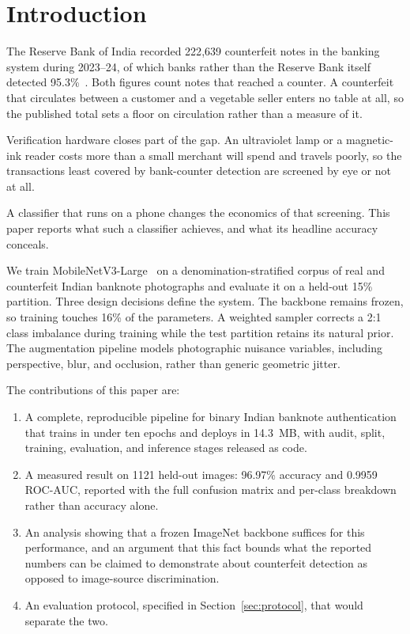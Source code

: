 \documentclass[conference]{IEEEtran}
\begin{document}
\section{Introduction}

The Reserve Bank of India recorded 222{,}639 counterfeit notes in the banking
system during 2023--24, of which banks rather than the Reserve Bank itself
detected 95.3\%~\cite{rbi2024annual}. Both figures count notes that reached a
counter. A counterfeit that circulates between a customer and a vegetable seller
enters no table at all, so the published total sets a floor on circulation rather
than a measure of it.

Verification hardware closes part of the gap. An ultraviolet lamp or a
magnetic-ink reader costs more than a small merchant will spend and travels
poorly, so the transactions least covered by bank-counter detection are screened
by eye or not at all.

A classifier that runs on a phone changes the economics of that screening. This
paper reports what such a classifier achieves, and what its headline accuracy
conceals.

We train MobileNetV3-Large~\cite{howard2019mobilenetv3} on a
denomination-stratified corpus of real and counterfeit Indian banknote
photographs and evaluate it on a held-out 15\% partition. Three design decisions
define the system. The backbone remains frozen, so training touches 16\% of the
parameters. A weighted sampler corrects a 2:1 class imbalance during training
while the test partition retains its natural prior. The augmentation pipeline
models photographic nuisance variables, including perspective, blur, and
occlusion, rather than generic geometric jitter.

The contributions of this paper are:

\begin{enumerate}
\item A complete, reproducible pipeline for binary Indian banknote
authentication that trains in under ten epochs and deploys in 14.3~MB, with
audit, split, training, evaluation, and inference stages released as code.
\item A measured result on 1121 held-out images: 96.97\% accuracy and 0.9959
ROC-AUC, reported with the full confusion matrix and per-class breakdown rather
than accuracy alone.
\item An analysis showing that a frozen ImageNet backbone suffices for this
performance, and an argument that this fact bounds what the reported numbers can
be claimed to demonstrate about counterfeit detection as opposed to image-source
discrimination.
\item An evaluation protocol, specified in Section~\ref{sec:protocol}, that
would separate the two.
\end{enumerate}
\end{document}
